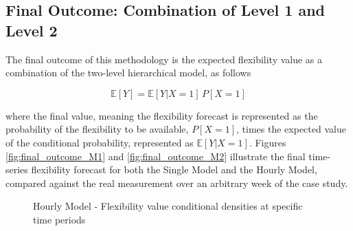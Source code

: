 \subsection{Final Outcome: Combination of Level 1 and Level 2}  \label{Sect:ResultsFinalOutcome} 
The final outcome of this methodology is the expected flexibility value as a combination of the two-level hierarchical model, as follows

\begin{equation}
  \mathbb{E}[Y] = \mathbb{E}[Y|X=1] \,  P[X=1]
\end{equation}

where the final value, meaning the flexibility forecast is represented as the probability of the flexibility to be available, $ P[X=1]$,  times the expected value of the conditional probability, represented as $\mathbb{E}[Y|X=1]$. Figures \ref{fig:final_outcome_M1} and \ref{fig:final_outcome_M2} illustrate the final time-series flexibility forecast for both the Single Model and the Hourly Model, compared against the real measurement over an arbitrary week of the case study.



\begin{figure}
\centering    
{}
\caption{Hourly Model - Flexibility value conditional densities at specific time periods}
\label{fig:conditional_densities_2}
\end{figure}



